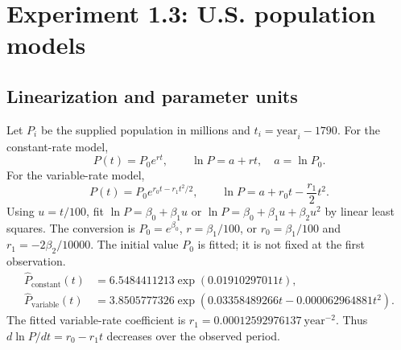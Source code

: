 \documentclass[11pt,a4paper]{article}
\begin{document}
\clearpage
\section{Experiment 1.3: U.S. population models}
\subsection{Linearization and parameter units}
Let $P_i$ be the supplied population in millions and $t_i=\text{year}_i-1790$. For the constant-rate model,
\[
P(t)=P_0e^{rt},\qquad \ln P=a+rt,\quad a=\ln P_0.
\]
For the variable-rate model,
\[
P(t)=P_0e^{r_0t-r_1t^2/2},\qquad \ln P=a+r_0t-\frac{r_1}{2}t^2.
\]
Using $u=t/100$, fit $\ln P=\beta_0+\beta_1u$ or $\ln P=\beta_0+\beta_1u+\beta_2u^2$ by linear least squares. The conversion is $P_0=e^{\beta_0}$, $r=\beta_1/100$, or $r_0=\beta_1/100$ and $r_1=-2\beta_2/10000$. The initial value $P_0$ is fitted; it is not fixed at the first observation.
\begin{align*}
\widehat P_{\mathrm{constant}}(t)&=6.5484411213\exp(0.01910297011t),\\
\widehat P_{\mathrm{variable}}(t)&=3.8505777326\exp(0.03358489266t-0.000062964881t^2).
\end{align*}
The fitted variable-rate coefficient is $r_1=0.00012592976137\ \mathrm{year}^{-2}$. Thus $d\ln P/dt=r_0-r_1t$ decreases over the observed period.
\end{document}

